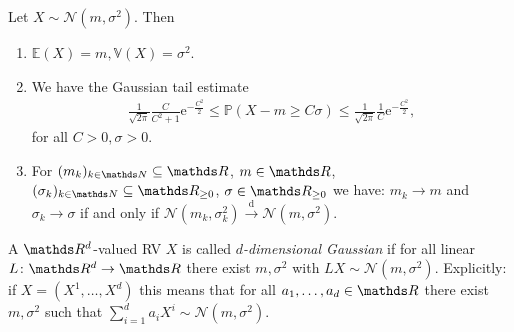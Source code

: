 \documentclass[10pt,a4paper]{report}
\begin{document}
\begin{prop}
Let $X\sim \mathcal{N}(m,\sigma^2)$. Then
\begin{enumerate}[label=(\alph*)]
\item $\mathds{E}(X)=m, \mathds{V}(X)=\sigma^2$.
\item We have the \glqq Gaussian tail estimate\grqq
\begin{align*}
\frac{1}{\sqrt{2\pi}} \frac{C}{C^2+1}\mathrm{e}^{-\frac{C^2}{2}}\leq \mathds{P}(X-m\geq C \sigma)\leq \frac{1}{\sqrt{2\pi}} \frac{1}{C}\mathrm{e}^{-\frac{C^2}{2}},
\end{align*}
for all $C>0,\sigma>0$.
\item For $(m_k)_{k\in \N}\subseteq \R$, $m\in \R$, $(\sigma_k)_{k\in \N}\subseteq \R_{\geq 0}$, $\sigma\in \R_{\geq 0}$ we have:
$m_k\to m$ and $\sigma_k\to \sigma$ if and only if $\mathcal{N}(m_k,\sigma_k^2)\overset{\text{d}}{\to} \mathcal{N}(m,\sigma^2)$.
\end{enumerate}
\end{prop}

\begin{defi}
A $\Rd$-valued RV $X$ is called \emph{$d$-dimensional Gaussian} if for all linear $L\colon \Rd\to \R$ there exist $m,\sigma^2$ with $LX\sim \mathcal{N}(m,\sigma^2)$.
Explicitly: if $X=(X^1,\dots,X^d)$ this means that for all $a_1,\dots,a_d \in \R$ there exist $m,\sigma^2$ such that $\sum_{i=1}^d a_i X^i \sim \mathcal{N}(m,\sigma^2)$.
\end{defi}
\end{document}
